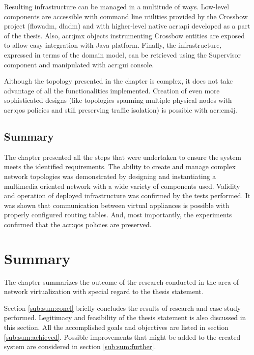 \documentclass[11pt,openany]{book}
\begin{document}
      Resulting infrastructure can be managed in a multitude of ways. Low-level components are accessible with command
      line utilities provided by the Crossbow project (flowadm, dladm) and with higher-level native \gls{acr:api}
      developed as a part of the thesis. Also, \gls{acr:jmx} objects instrumenting Crossbow entities are exposed to
      allow easy integration with Java platform. Finally, the infrastructure, expressed in terms of the domain model,
      can be retrieved using the Supervisor component and manipulated with \gls{acr:gui} console.

      Although the topology presented in the chapter is complex, it does not take advantage of all the functionalities
      implemented. Creation of even more sophisticated designs (like topologies spanning multiple physical nodes with
      \gls{acr:qos} policies and still preserving traffic isolation) is possible with \gls{acr:cm4j}.


    \section*{Summary}

      The chapter presented all the steps that were undertaken to ensure the system meets the identified requirements.
      The ability to create and manage complex network topologies was demonstrated by designing and instantiating
      a multimedia oriented network with a wide variety of components used. Validity and operation of deployed
      infrastructure was confirmed by the tests performed. It was shown that communication between virtual appliances is
      possible with properly configured routing tables. And, most importantly, the experiments confirmed that
      the \gls{acr:qos} policies are preserved.


  \chapter{Summary}
  \label{chap:sum}

    The chapter summarizes the outcome of the research conducted in the area of network virtualization with special
    regard to the thesis statement.
	
    Section \ref{sub:sum:concl} briefly concludes the results of research and case study performed. Legitimacy and
    feasibility of the thesis statement is also discussed in this section. All the accomplished goals and objectives are
    listed in section \ref{sub:sum:achieved}. Possible improvements that might be added to the created system are
    considered in section \ref{sub:sum:further}.
\end{document}
